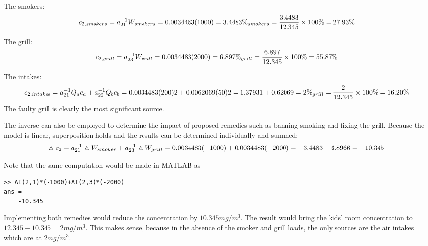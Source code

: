 \documentclass[../main.tex]{subfiles}
\begin{document}
The smokers:
\begin{equation}
c_{2,smokers} = a_{21}^{-1} W_{smokers} = 0.0034483(1000) = 3.4483\\
\%_{smokers} = \frac{3.4483}{12.345} \times 100\% = 27.93\%
\end{equation}

The grill:
\begin{equation}
c_{2,grill} = a_{23}^{-1} W_{grill} = 0.0034483(2000) = 6.897\\
\%_{grill} = \frac{6.897}{12.345} \times 100\% = 55.87\%
\end{equation}

The intakes:
\begin{equation}
c_{2,intakes} = a_{21}^{-1} Q_{a}c_{a} + a_{22}^{-1} Q_{b}c_{b} = 0.0034483(200)2 + 0.0062069(50)2
= 1.37931 + 0.62069 = 2\\
\%_{grill} = \frac{2}{12.345}\times 100\% = 16.20\%
\end{equation}
The faulty grill is clearly the most significant source.

The inverse can also be employed to determine the impact of proposed remedies such
as banning smoking and fixing the grill. Because the model is linear, superposition holds
and the results can be determined individually and summed:
\begin{equation}
\vartriangle c_{2} = a_{21}^{-1} \vartriangle W_{smoker} + a_{23}^{-1} \vartriangle W_{grill} = 0.0034483(-1000) + 0.0034483(-2000)\\
= -3.4483 - 6.8966 = -10.345
\end{equation}

Note that the same computation would be made in MATLAB as
\begin{lstlisting}[numbers=none]
>> AI(2,1)*(-1000)+AI(2,3)*(-2000)
ans =
	-10.345
\end{lstlisting}

Implementing both remedies would reduce the concentration by $10.345 mg/m^{3}$. The result would bring the kids' room concentration to $12.345 - 10.345 = 2 mg/m^{3}$. This makes sense, because in the absence of the smoker and grill loads, the only sources are the air intakes which are at $2 mg/m^{3}$. 
\end{document}
